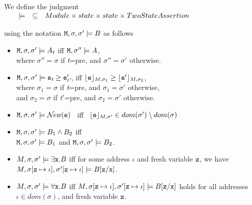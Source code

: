 \begin{definition}
 We define the judgment \\
$
\begin{array}{c}
\begin{array}{lcl}
\ \ \  \models  &   \subseteq &   Module \times state \times state \times TwoStateAssertion
\end{array}
\end{array}
$

\noindent
using the notation ${{\textrm{\ttfamily{M}}}{{{\textrm{\ttfamily{}}}}}},\sigma,\sigma'\models B $ as follows
\begin{itemize}
\item
${{\textrm{\ttfamily{M}}}{{{\textrm{\ttfamily{}}}}}},\sigma,\sigma'\models {\ensuremath {A}}_{\textit{t}}$  
iff   ${{\textrm{\ttfamily{M}}}{{{\textrm{\ttfamily{}}}}}},\sigma''\models {\ensuremath {A}}$, \\
where  $\sigma''=\sigma$ if  {{\textit{t}}}=\textsf{pre}, and  $\sigma''=\sigma'$ otherwise.
\item 
${{\textrm{\ttfamily{M}}}{{{\textrm{\ttfamily{}}}}}},\sigma,\sigma'\models {{{\ensuremath{\textrm{\ttfamily{e}}}}}}_{\textit{t}} \geq {{\ensuremath{\textrm{\ttfamily{e}}}}}'_{\textit{t'}}$,
    iff ${\lfloor{ {{{{\ensuremath{\textrm{\ttfamily{e}}}}}}}}\rfloor_{M,\sigma_1}} \geq {\ensuremath{\lfloor{ {{{{\ensuremath{\textrm{\ttfamily{e}}}}}'}}}\rfloor_{M,\sigma_2}}}$,\\
    where $\sigma_1=\sigma$ if  {{\textit{t}}}=\textsf{pre}, and  $\sigma_1=\sigma'$ otherwise,\\
    and $\sigma_2=\sigma$ if  {{\textit{t}}}$'$=\textsf{pre}, and  $\sigma_2=\sigma'$ otherwise.  
\item 
${{\textrm{\ttfamily{M}}}{{{\textrm{\ttfamily{}}}}}},\sigma,\sigma'\models {\mathcal{N}}\!\textrm{\textit{ew}}({{{\textrm{\ttfamily{e}}}}})$
\ iff \ 
${\lfloor{ {{{{\ensuremath{\textrm{\ttfamily{e}}}}}}}}\rfloor_{M,\sigma'}}\in dom(\sigma')\setminus dom(\sigma)$
\item
${{\textrm{\ttfamily{M}}}{{{\textrm{\ttfamily{}}}}}},\sigma,\sigma'\models  {\ensuremath {B}}_1   \wedge {\ensuremath {B}}_2$   iff\\
 ${{\textrm{\ttfamily{M}}}{{{\textrm{\ttfamily{}}}}}},\sigma,\sigma'\models  {\ensuremath {B}}_1 $
    and   ${{\textrm{\ttfamily{M}}}{{{\textrm{\ttfamily{}}}}}},\sigma,\sigma'\models  {\ensuremath {B}}_2  $.
\item
  $M,\sigma,\sigma'  \models \exists {\ensuremath{\textrm{\ttfamily{x}}}}.{B}$ iff for some address $\iota$ and fresh variable ${\textrm{\ttfamily{z}}}$,  we have $M,\sigma[{\textrm{\ttfamily{z}}}\mapsto\iota], \sigma'[{\textrm{\ttfamily{z}}}\mapsto\iota] \models  {\ensuremath {B}[{\ensuremath{\textrm{\ttfamily{z}}}}/{\ensuremath{\textrm{\ttfamily{x}}}}}]$. 
  \item
  $M,\sigma,\sigma'  \models \forall {\ensuremath{\textrm{\ttfamily{x}}}}.{B}$ iff $M,\sigma[{\textrm{\ttfamily{z}}}\mapsto\iota],\sigma'[{\textrm{\ttfamily{z}}}\mapsto\iota]   \models  {\ensuremath {B}[{\ensuremath{\textrm{\ttfamily{z}}}}/{\ensuremath{\textrm{\ttfamily{x}}}}}]$ holds for all addresses $\iota\!\in dom\!(\sigma)$, and fresh variable ${\textrm{\ttfamily{z}}}$.  

\end{itemize}

\end{definition}

